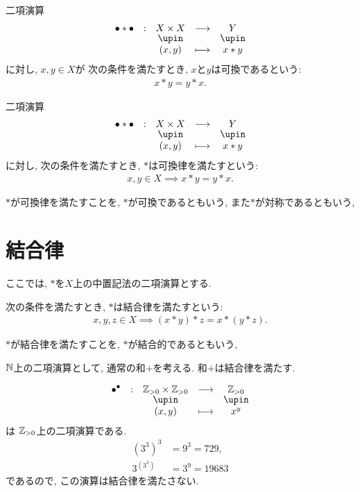 \begin{definition}
  二項演算
  \begin{align*}
    \shazo{\tofu\ast\tofu}
          {X\times X}{Y}
          {(x,y)}{x\ast y}
  \end{align*}
  に対し,
  $x,y\in X$が
  次の条件を満たすとき,
  $x$と$y$は可換であるという:
  \begin{align*}
    x\ast y=y\ast x.
  \end{align*}
\end{definition}
\begin{definition}
  二項演算
  \begin{align*}
    \shazo{\tofu\ast\tofu}
          {X\times X}{Y}
          {(x,y)}{x\ast y}
  \end{align*}
  に対し,
  次の条件を満たすとき,
  $\ast$は可換律を満たすという:
  \begin{align*}
    x,y\in X\implies x\ast y=y\ast x.
  \end{align*}
\end{definition}
\begin{remark}
  $\ast$が可換律を満たすことを,
  $\ast$が可換であるともいう,
  また$\ast$が対称であるともいう,
\end{remark}


\section{結合律}
ここでは,
$\ast$を$X$上の中置記法の二項演算とする.
\begin{definition}
  次の条件を満たすとき,
  $\ast$は結合律を満たすという:
  \begin{align*}
    x,y,z\in X\implies (x\ast y)\ast z = x\ast (y\ast z).
  \end{align*}
\end{definition}
\begin{remark}
  $\ast$が結合律を満たすことを,
  $\ast$が結合的であるともいう,
\end{remark}
\begin{example}
  $\mathbb{N}$上の二項演算として,
  通常の和$+$を考える.
  和$+$は結合律を満たす.
\end{example}
\begin{nonexample}
\begin{align*}
  \shazo{\tofu^\tofu}
        {\ZZ_{>0}\times \ZZ_{>0}}{\ZZ_{>0}}
        {(x,y)}{x^y}
\end{align*}
は
$\mathbb{Z}_{>0}$上の二項演算である.
\begin{align*}
  (3^3)^3&=9^3=729,\\
  3^{(3^3)}&=3^9=19683
\end{align*}
であるので,
この演算は結合律を満たさない.
\end{nonexample}

